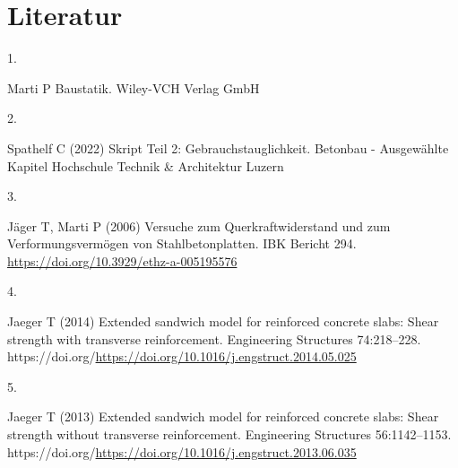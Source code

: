 \documentclass[
  12pt,
  letterpaper,
  egregdoesnotlikesansseriftitles]{scrreprt}
\newlength{\cslhangindent}
\newlength{\csllabelwidth}
\newlength{\cslentryspacingunit} %
\newenvironment{CSLReferences}[2] %
 {%
  \setlength{\parindent}{0pt}
  \ifodd #1
  \let\oldpar\par
  \def\par{\hangindent=\cslhangindent\oldpar}
  \fi
  \setlength{\parskip}{#2\cslentryspacingunit}
 }%
 {}
\newcommand{\CSLLeftMargin}[1]{\parbox[t]{\csllabelwidth}{#1}}
\newcommand{\CSLRightInline}[1]{\parbox[t]{\linewidth - \csllabelwidth}{#1}\break}
\begin{document}

\hypertarget{literatur}{%
\chapter*{Literatur}\label{literatur}}


\hypertarget{refs}{}
\begin{CSLReferences}{0}{0}
\leavevmode{}%
\CSLLeftMargin{1. }%
\CSLRightInline{Marti P Baustatik. Wiley-VCH Verlag GmbH}

\leavevmode{}%
\CSLLeftMargin{2. }%
\CSLRightInline{Spathelf C (2022) Skript Teil 2: Gebrauchstauglichkeit.
Betonbau - Ausgewählte Kapitel Hochschule Technik \& Architektur Luzern}

\leavevmode{}%
\CSLLeftMargin{3. }%
\CSLRightInline{Jäger T, Marti P (2006) Versuche zum
{Querkraftwiderstand} und zum {Verformungsvermögen} von
{Stahlbetonplatten}. IBK Bericht 294.
\url{https://doi.org/10.3929/ethz-a-005195576}}

\leavevmode{}%
\CSLLeftMargin{4. }%
\CSLRightInline{Jaeger T (2014) Extended sandwich model for reinforced
concrete slabs: Shear strength with transverse reinforcement.
Engineering Structures 74:218--228.
https://doi.org/\url{https://doi.org/10.1016/j.engstruct.2014.05.025}}

\leavevmode{}%
\CSLLeftMargin{5. }%
\CSLRightInline{Jaeger T (2013) Extended sandwich model for reinforced
concrete slabs: Shear strength without transverse reinforcement.
Engineering Structures 56:1142--1153.
https://doi.org/\url{https://doi.org/10.1016/j.engstruct.2013.06.035}}

\end{CSLReferences}
\end{document}
